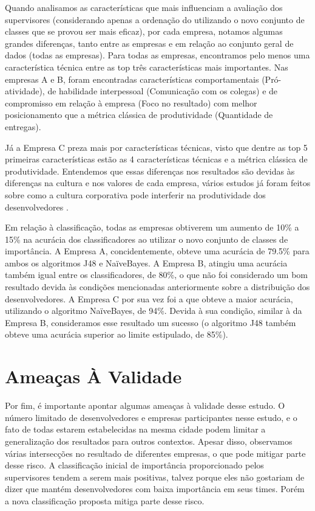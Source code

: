 Quando analisamos as características que mais influenciam a avaliação dos supervisores (considerando apenas a ordenação do utilizando o novo conjunto de classes que se provou ser mais eficaz), por cada empresa, notamos algumas grandes diferenças, tanto entre as empresas e em relação ao conjunto geral de dados (todas as empresas). Para todas as empresas, encontramos pelo menos uma característica técnica entre as top três características mais importantes. Nas empresas A e B, foram encontradas características comportamentais (Pró-atividade), de habilidade interpessoal (Comunicação com os colegas) e de compromisso em relação à empresa (Foco no resultado) com melhor posicionamento que a métrica clássica de produtividade (Quantidade de entregas).

Já a Empresa C preza mais por características técnicas, visto que dentre as top 5 primeiras características estão as 4 características técnicas e a métrica clássica de produtividade. Entendemos que essas diferenças nos resultados são devidas às diferenças na cultura e nos valores de cada empresa, vários estudos já foram feitos sobre como a cultura corporativa pode interferir na produtividade dos desenvolvedores \cite{Edmans2011,Jones2000,Scudder1991,AgrellA.andGustafson1994,Guzzo1988,McLean1996,Turcotte2004}.

Em relação à classificação, todas as empresas obtiverem um aumento de 10\% a 15\% na acurácia dos classificadores ao utilizar o novo conjunto de classes de importância. A Empresa A, concidentemente, obteve uma acurácia de 79.5\% para ambos os algoritmos J48 e NaïveBayes. A Empresa B, atingiu uma acurácia também igual entre os classificadores, de 80\%, o que não foi considerado um bom resultado devida às condições mencionadas anteriormente sobre a distribuição dos desenvolvedores. A Empresa C por sua vez foi a que obteve a maior acurácia, utilizando o algoritmo NaïveBayes, de 94\%. Devida à sua condição, similar à da Empresa B, consideramos esse resultado um sucesso (o algoritmo J48 também obteve uma acurácia superior ao limite estipulado, de 85\%).

\section{Ameaças À Validade}

Por fim, é importante apontar algumas ameaças à validade desse estudo. O número limitado de desenvolvedores e empresas participantes nesse estudo, e o fato de todas estarem estabelecidas na mesma cidade podem limitar a generalização dos resultados para outros contextos. Apesar disso, observamos várias intersecções no resultado de diferentes empresas, o que pode mitigar parte desse risco. A classificação inicial de importância proporcionado pelos supervisores tendem a serem mais positivas, talvez porque eles não gostariam de dizer que mantém desenvolvedores com baixa importância em seus times. Porém a nova classificação proposta mitiga parte desse risco.

